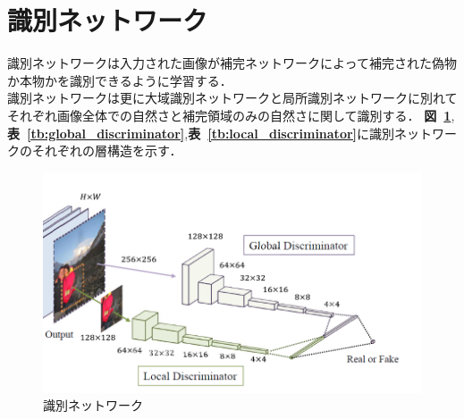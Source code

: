 \documentclass[a4j, 11pt]{jreport}
\newcommand{\figref}[1]{\textbf{図~\ref{#1}}}
\newcommand{\tabref}[1]{\textbf{表~\ref{#1}}}
\begin{document}
\section{識別ネットワーク}
識別ネットワークは入力された画像が補完ネットワークによって補完された偽物か本物かを識別できるように学習する．\\
識別ネットワークは更に大域識別ネットワークと局所識別ネットワークに別れてそれぞれ画像全体での自然さと補完領域のみの自然さに関して識別する．
\figref{fig:discrimination},\tabref{tb:global_discriminator},\tabref{tb:local_discriminator}に識別ネットワークのそれぞれの層構造を示す．
\begin{figure}[H]
	\centering
	\includegraphics[width=\linewidth]{images/old-study/discriminator.png}
	\caption{識別ネットワーク}
	\label{fig:discrimination}
\end{figure}
\end{document}
